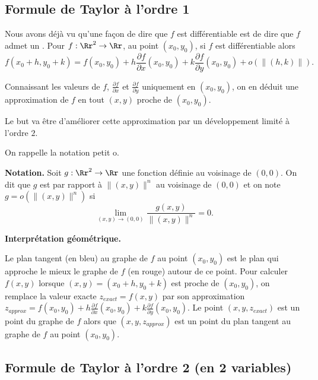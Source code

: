 \subsection{Formule de Taylor à l'ordre 1}

Nous avons déjà vu qu'une façon de dire que $f$ est différentiable est de dire que $f$ admet un . Pour $f : \Rr^2 \to \Rr$,
au point $(x_0,y_0)$, si $f$ est différentiable alors
$$f(x_0+h,y_0+k)=f(x_0,y_0)+h\frac{\partial f}{\partial x}(x_0,y_0)+k\frac{\partial f}{\partial y}(x_0,y_0)+o\left(\|(h,k)\|\right).$$

Connaissant les valeurs de $f$, $\frac{\partial f}{\partial x}$
et $\frac{\partial f}{\partial y}$ uniquement en $(x_0,y_0)$, on en déduit une approximation de $f$ en tout $(x,y)$ proche de $(x_0,y_0)$.

\medskip

Le but va être d'améliorer cette approximation par un développement limité à l'ordre $2$.

On rappelle la notation \og{}petit o\fg{}.

\textbf{Notation.} Soit $g :\Rr^2\to \Rr$ une fonction définie au voisinage de $(0,0)$. On dit que $g$ est  par rapport à $\|(x,y)\|^n$ au voisinage de $(0,0)$ et on note $g=o\left(\|(x,y)\|^n\right)$ si 
$$\lim_{(x,y)\to(0,0)}\frac{g(x,y)}{\|(x,y)\|^n}=0.$$

\textbf{Interprétation géométrique.}

Le plan tangent (en bleu) au graphe de $f$ au point $(x_0,y_0)$ est le plan qui approche le mieux le graphe de $f$ (en rouge) autour de ce point.
Pour calculer $f(x,y)$ lorsque $(x,y)=(x_0+h,y_0+k)$ est proche de $(x_0,y_0)$, on remplace la valeur exacte $z_{exact} = f(x,y)$ 
par son approximation $z_{approx} = f(x_0,y_0)+h\frac{\partial f}{\partial x}(x_0,y_0)+k\frac{\partial f}{\partial y}(x_0,y_0)$.
Le point $(x,y,z_{exact})$ est un point du graphe de $f$ alors que
$(x,y,z_{approx})$ est un point du plan tangent au graphe de $f$ au point $(x_0,y_0)$. 




\subsection{Formule de Taylor à l'ordre 2 (en 2 variables)}

